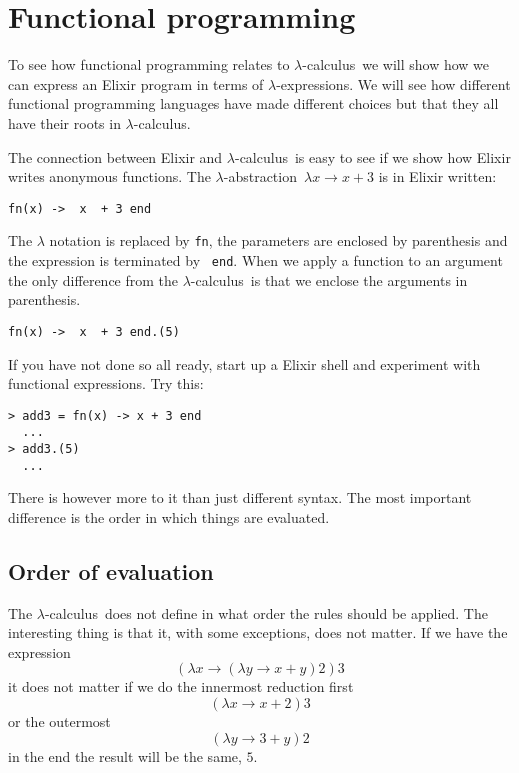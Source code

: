 \documentclass[a4paper,11pt]{article}
\newcommand{\lamc}[0]{$\lambda$-calculus}
\newcommand{\lama}[0]{$\lambda$-abstraction}
\newcommand{\lame}[0]{$\lambda$-expression}
\begin{document}
\section{Functional programming}

To see how functional programming relates to \lamc\ we will show how
we can express an Elixir program in terms of \lame s. We will see how
different functional programming languages have made different choices
but that they all have their roots in \lamc.

The connection between Elixir and \lamc\ is easy to see if we show how
Elixir writes anonymous functions. The \lama\
$\lambda x \rightarrow x + 3$ is in Elixir written:

\begin{verbatim}
fn(x) ->  x  + 3 end
\end{verbatim}

The $\lambda$ notation is replaced by {\tt fn}, the parameters are
enclosed by parenthesis and the expression is terminated by {\tt
  end}. When we apply a function to an argument the only difference
from the \lamc\ is that we enclose the arguments in parenthesis.

\begin{verbatim}
fn(x) ->  x  + 3 end.(5)
\end{verbatim}

If you have not done so all ready, start up a Elixir shell and
experiment with functional expressions. Try this:

\begin{verbatim}
> add3 = fn(x) -> x + 3 end
  ...
> add3.(5)
  ...
\end{verbatim}

There is however more to it than just different syntax. The most
important difference is the order in which things are evaluated.


\subsection{Order of evaluation}

The \lamc\ does not define in what order the rules should be applied. The
interesting thing is that it, with some exceptions, does not matter. If we
have the expression
$$(\lambda x \rightarrow (\lambda y \rightarrow x + y) 2) 3$$ 
it does not matter if we do the innermost reduction first
$$(\lambda x \rightarrow x + 2) 3$$ 
or the outermost 
$$ (\lambda y \rightarrow 3 + y) 2$$ 
in the end the result will be the same, $5$.
\end{document}

